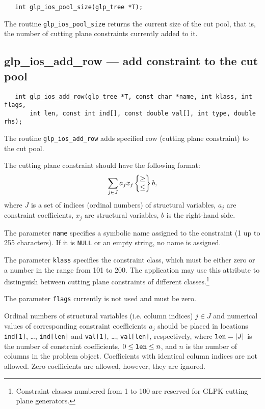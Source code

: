\synopsis

\begin{verbatim}
   int glp_ios_pool_size(glp_tree *T);
\end{verbatim}

\returns

The routine \verb|glp_ios_pool_size| returns the current size of the
cut pool, that is, the number of cutting plane constraints currently
added to it.

\subsection{glp\_ios\_add\_row --- add constraint to the cut pool}

\synopsis

\begin{verbatim}
   int glp_ios_add_row(glp_tree *T, const char *name, int klass, int flags,
       int len, const int ind[], const double val[], int type, double rhs);
\end{verbatim}

\description

The routine \verb|glp_ios_add_row| adds specified row (cutting plane
constraint) to the cut pool.

The cutting plane constraint should have the following format:
$$\sum_{j\in J}a_jx_j\left\{\begin{array}{@{}c@{}}\geq\\\leq\\
\end{array}\right\}b,$$
where $J$ is a set of indices (ordinal numbers) of structural
variables, $a_j$ are constraint coefficients, $x_j$ are structural
variables, $b$ is the right-hand side.

The parameter \verb|name| specifies a symbolic name assigned to the
constraint (1 up to 255 characters). If it is \verb|NULL| or an empty
string, no name is assigned.

The parameter \verb|klass| specifies the constraint class, which must
be either zero or a number in the range from 101 to 200.
The application may use this attribute to distinguish between cutting
plane constraints of different classes.\footnote{Constraint classes
numbered from 1 to 100 are reserved for GLPK cutting plane generators.}

The parameter \verb|flags| currently is not used and must be zero.

Ordinal numbers of structural variables (i.e. column indices) $j\in J$
and numerical values of corresponding constraint coefficients $a_j$
should be placed in locations \verb|ind[1]|, \dots, \verb|ind[len]| and
\verb|val[1]|, \dots, \verb|val[len]|, respectively, where
${\tt len}=|J|$ is the number of constraint coefficients,
$0\leq{\tt len}\leq n$, and $n$ is the number of columns in the problem
object. Coefficients with identical column indices are not allowed.
Zero coefficients are allowed, however, they are ignored.

